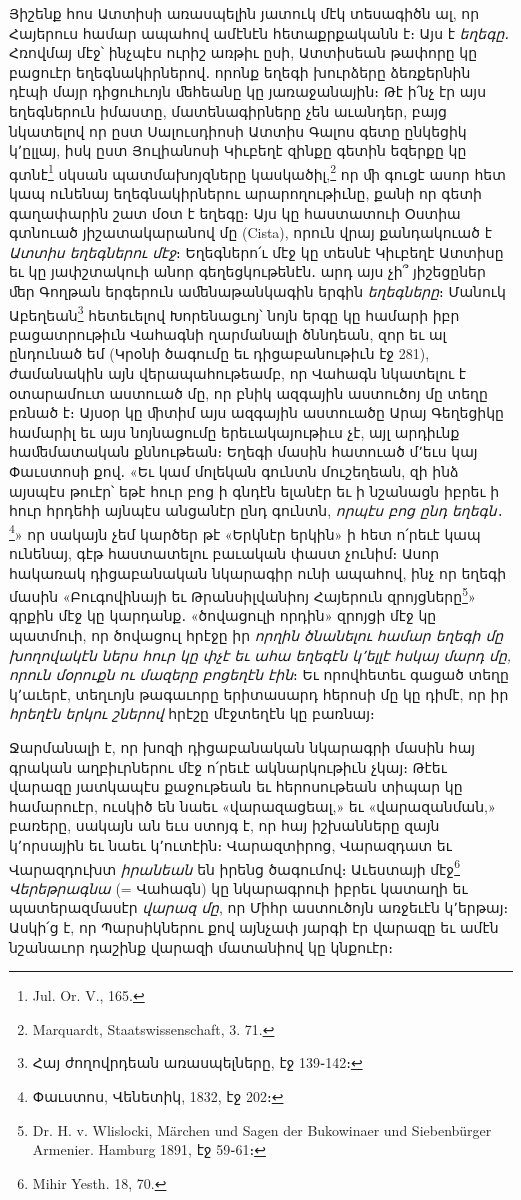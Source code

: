 \documentclass{article}
\begin{document}
{Յիշենք հոս Ատտիսի առասպելին յատուկ մէկ տեսագիծն ալ, որ Հայերուս համար ապահով ամէնէն հետաքրքականն է։ Այս է \emph{եղեգը․} Հռովմայ մէջ՝ ինչպէս ուրիշ առթիւ ըսի, Ատտիսեան թափորը կը բացուէր եղեգնակիրներով․ որոնք եղեգի խուրձերը ձեռքերնին դէպի մայր դիցուհւոյն ﬔհեանը կը յառաջանային։ Թէ ի՛նչ էր այս եղեգներուն իմաստը, մատենագիրները չեն աւանդեր, բայց նկատելով որ ըստ Սալուսդիոսի Ատտիս Գալոս գետը ընկեցիկ կ՚ըլլայ, իսկ ըստ Յուլիանոսի Կիւբեղէ զինքը գետին եզերքը կը գտնէ\footnote{Jul. Or. V., 165.} սկսան պատմախոյզները կասկածիլ,\footnote{Marquardt, Staatswissenschaft, 3. 71.} որ ﬕ գուցէ ասոր հետ կապ ունենայ եղեգնակիրներու արարողութիւնը, քանի որ գետի գաղափարին շատ մօտ է եղեգը։ Այս կը հաստատուի Օստիա գտնուած յիշատակարանով մը (Cista), որուն վրայ քանդակուած է \emph{Ատտիս եղեգներու մէջ}։ Եղեգներո՛ւ մէջ կը տեսնէ Կիւբեղէ Ատտիսը եւ կը յափշտակուի անոր գեղեցկութենէն․ արդ այս չի՞ յիշեցըներ ﬔր Գողթան երգերուն աﬔնաթանկագին երգին \emph{եղեգները}։ Մանուկ Աբեղեան\footnote{Հայ ժողովրդեան առասպելները, էջ 139֊142։} հետեւելով Խորենացւոյ՝ նոյն երգը կը համարի իբր բացատրութիւն Վահագնի ղարմանալի ծննդեան, զոր եւ ալ ընդունած եմ (Կրօնի ծագումը եւ դիցաբանութիւն էջ 281), ժամանակին այն վերապահութեամբ, որ Վահագն նկատելու է օտարամուտ աստուած մը, որ բնիկ ազգային աստուծոյ մը տեղը բռնած է։ Այսօր կը ﬕտիմ այս ազգային աստուածը Արայ Գեղեցիկը համարիլ եւ այս նոյնացումը երեւակայութիւս չէ, այլ արդիւնք հաﬔմատական քննութեան։ Եղեգի մասին հատուած մ՚եւս կայ Փաւստոսի քով․ «Եւ կամ մոլեկան գունտն մուշեղեան, զի ինձ այսպէս թուէր՝ եթէ հուր բոց ի գնդէն ելանէր եւ ի նշանացն իբրեւ ի հուր հրդեհի այնպէս անցանէր ընդ գունտն, \emph{որպէս բոց ընդ եղեգն}․\footnote{Փաւստոս, Վենետիկ, 1832, էջ 202։}» որ սակայն չեմ կարծեր թէ «Երկնէր երկին» ի հետ ո՛րեւէ կապ ունենայ, գէթ հաստատելու բաւական փաստ չունիմ։ Ասոր հակառակ դիցաբանական նկարագիր ունի ապահով, ինչ որ եղեգի մասին «Բուգովինայի եւ Թրանսիլվանիոյ Հայերուն զրոյցները\footnote{Dr. H. v. Wlislocki, Märchen und Sagen der Bukowinaer und Siebenbürger Armenier. Hamburg 1891, էջ 59֊61։}» գրքին մէջ կը կարդանք․ «ծովացուլի որդին» զրոյցի մէջ կը պատմուի, որ ծովացուլ հրէջը իր \emph{որղին ծնանելու համար եղեգի մը խողովակէն ներս հուր կը փչէ եւ ահա եղեգէն կ՚ելլէ հսկայ մարդ մը, որուն մօրուքն ու մազերը բոցեղէն էին}։ Եւ որովհետեւ գացած տեղը կ՚աւերէ, տեղւոյն թագաւորը երիտասարդ հերոսի մը կը դիմէ, որ իր \emph{հրեղէն երկու շներով} հրէշը մէջտեղէն կը բառնայ։

Ջարմանալի է, որ խոզի դիցաբանական նկարագրի մասին հայ գրական աղբիւրներու մէջ ո՛րեւէ ակնարկութիւն չկայ։ Թէեւ վարազը յատկապէս քաջութեան եւ հերոսութեան տիպար կը համարուէր, ուսկիծ են նաեւ «վարազացեալ,» եւ «վարազանման,» բառերը, սակայն ան եւս ստոյգ է, որ հայ իշխանները զայն կ՚որսային եւ նաեւ կ՚ուտէին։ Վարազտիրոց, Վարազդատ եւ Վարազդուխտ \emph{իրանեան} են իրենց ծագումով։ Աւեստայի մէջ\footnote{Mihir Yesth. 18, 70.} \emph{Վերեթրագնա} (= Վահագն) կը նկարագրուի իբրեւ կատաղի եւ պատերազմասէր \emph{վարազ մը}, որ Միհր աստուծոյն առջեւէն կ՚երթայ։ Ասկի՛ց է, որ Պարսիկներու քով այնչափ յարգի էր վարազը եւ ամէն նշանաւոր դաշինք վարազի մատանիով կը կնքուէր։

}
\end{document}
